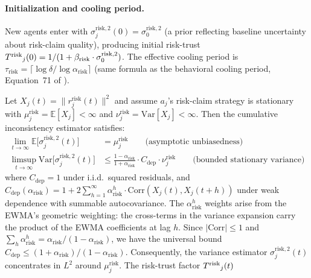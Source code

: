 \paragraph{Initialization and cooling period.} New agents enter with
$\sigma_j^{\mathrm{risk},2}(0) = \sigma_0^{\mathrm{risk},2}$ (a prior
reflecting baseline uncertainty about risk-claim quality), producing initial
risk-trust ${T^{\mathrm{risk}}}_j(0) = 1/(1 + \beta_{\mathrm{risk}} \cdot
\sigma_0^{\mathrm{risk},2})$. The effective cooling period is
$\tau_{\mathrm{risk}} = \lceil \log \delta / \log
\alpha_{\mathrm{risk}} \rceil$ (same formula as the behavioral cooling
period, Equation~71 of \citet{lasser2026gfm}).

\begin{proposition}
\label{prop:risk_convergence}
Let $X_j(t) = \|r_j^{\mathrm{risk}}(t)\|^2$ and assume $a_j$'s risk-claim
    strategy is stationary with
    $\mu_j^{\mathrm{risk}} = \mathbb{E}[X_j] < \infty$ and
    $\nu_j^{\mathrm{risk}} = \mathrm{Var}[X_j] < \infty$. Then the
    cumulative inconsistency estimator satisfies:
\begin{align}
\label{eq:risk_trust_bias}
\lim_{t \to \infty} \mathbb{E}\bigl[\sigma_j^{\mathrm{risk},2}(t)\bigr]
    &= \mu_j^{\mathrm{risk}}
    \qquad \text{(asymptotic unbiasedness)} \\
\label{eq:risk_trust_variance}
\limsup_{t \to \infty}
    \mathrm{Var}\bigl[\sigma_j^{\mathrm{risk},2}(t)\bigr]
    &\leq \frac{1 - \alpha_{\mathrm{risk}}}
              {1 + \alpha_{\mathrm{risk}}}
       \cdot C_{\mathrm{dep}} \cdot \nu_j^{\mathrm{risk}}
    \qquad \text{(bounded stationary variance)}
\end{align}
where $C_{\mathrm{dep}} = 1$ under i.i.d.\ squared residuals, and
    $C_{\mathrm{dep}}(\alpha_{\mathrm{risk}}) = 1 + 2
    \sum_{h=1}^{\infty} \alpha_{\mathrm{risk}}^h \cdot
    \mathrm{Corr}(X_j(t), X_j(t+h))$ under weak dependence with
    summable autocovariance. The $\alpha_{\mathrm{risk}}^h$ weights
    arise from the EWMA's geometric weighting: the cross-terms in the
    variance expansion carry the product of the EWMA coefficients at
    lag $h$. Since $|\mathrm{Corr}| \leq 1$ and
    $\sum_h \alpha_{\mathrm{risk}}^h = \alpha_{\mathrm{risk}} /
    (1 - \alpha_{\mathrm{risk}})$, we have the universal bound
    $C_{\mathrm{dep}} \leq (1 + \alpha_{\mathrm{risk}}) /
    (1 - \alpha_{\mathrm{risk}})$.
Consequently, the variance estimator
    $\sigma_j^{\mathrm{risk},2}(t)$ concentrates in $L^2$ around
    $\mu_j^{\mathrm{risk}}$. The risk-trust factor ${T^{\mathrm{risk}}}_j(t)$

\end{proposition}
